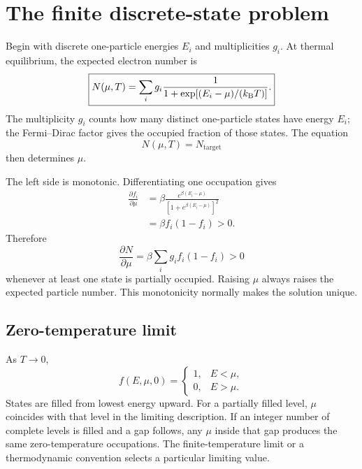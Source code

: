 \section{The finite discrete-state problem}

Begin with discrete one-particle energies $E_i$ and multiplicities $g_i$.  At
thermal equilibrium, the expected electron number is
\begin{equation}
  \boxed{
  N(\mu,T)
  =\sum_i g_i
   \frac{1}{1+\exp[(E_i-\mu)/(k_{\mathrm B} T)]}.
  }
  \label{eq:discrete-electron-number-constraint}
\end{equation}
The multiplicity $g_i$ counts how many distinct one-particle states have energy
$E_i$; the Fermi--Dirac factor gives the occupied fraction of those states.
The equation
\begin{equation}
  N(\mu,T)=N_{\mathrm{target}}
  \label{eq:discrete-chemical-potential-equation}
\end{equation}
then determines $\mu$.

The left side is monotonic.  Differentiating one occupation gives
\begin{equation}
\begin{aligned}
  \frac{\partial f_i}{\partial\mu}
  &=\beta
    \frac{e^{\beta(E_i-\mu)}}
         {[1+e^{\beta(E_i-\mu)}]^2}\\
  &=\beta f_i(1-f_i)>0.
\end{aligned}
  \label{eq:fermi-occupation-mu-derivative}
\end{equation}
Therefore
\begin{equation}
  \frac{\partial N}{\partial\mu}
  =\beta\sum_i g_i f_i(1-f_i)>0
  \label{eq:discrete-particle-number-monotonicity}
\end{equation}
whenever at least one state is partially occupied.  Raising $\mu$ always raises
the expected particle number.  This monotonicity normally makes the solution
unique.

\subsection{Zero-temperature limit}

As $T\rightarrow0$,
\begin{equation}
  f(E,\mu,0)
  =\begin{cases}
      1, & E<\mu,\\
      0, & E>\mu.
    \end{cases}
  \label{eq:zero-temperature-step-occupation}
\end{equation}
States are filled from lowest energy upward.  For a partially filled level,
$\mu$ coincides with that level in the limiting description.  If an integer
number of complete levels is filled and a gap follows, any $\mu$ inside that
gap produces the same zero-temperature occupations.  The finite-temperature
limit or a thermodynamic convention selects a particular limiting value.

